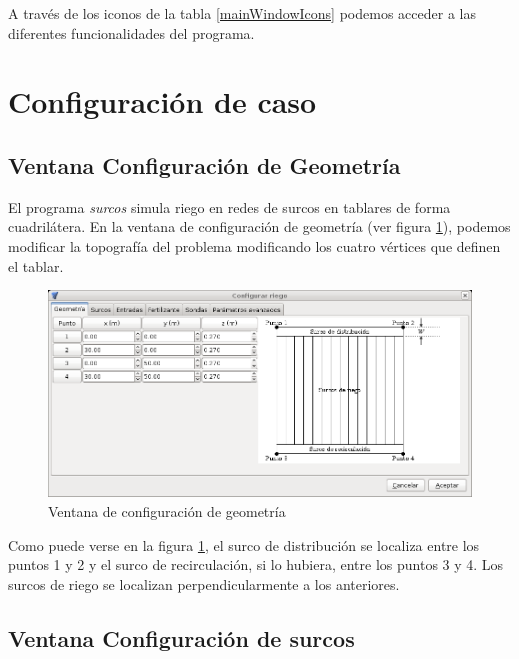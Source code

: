 A través de los iconos de la tabla \ref{mainWindowIcons} podemos acceder a las diferentes funcionalidades del programa.\\
\section{Configuración de caso}
\subsection{Ventana Configuración de Geometría}

El programa \emph{surcos} simula riego en redes de surcos en tablares de forma cuadrilátera. En la ventana de configuración de geometría (ver figura \ref{geomWindow}), podemos modificar la topografía del problema modificando los cuatro vértices que definen el tablar.

\begin{figure}[!h]
\begin{center}
\includegraphics*[width=\textwidth]{images/confGeom.png}
\qquad
\caption{Ventana de configuración de geometría}\label{geomWindow}
\end{center}
\end{figure}

Como puede verse en la figura \ref{geomWindow}, el surco de distribución se localiza entre los puntos 1 y 2 y el surco de recirculación, si lo hubiera, entre los puntos 3 y 4. Los surcos de riego se localizan perpendicularmente a los anteriores.

\subsection{Ventana Configuración de surcos}

